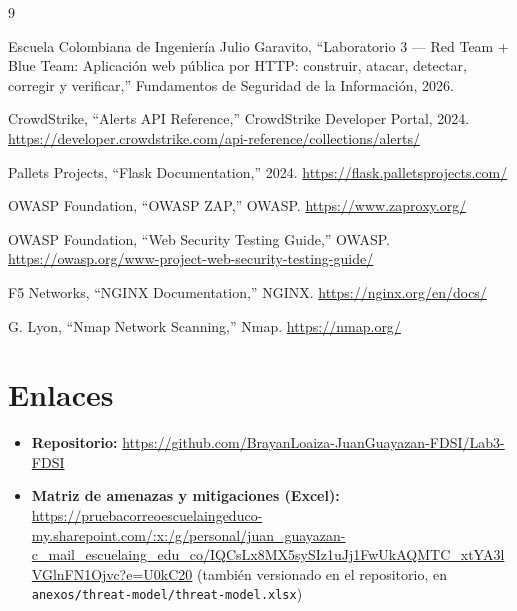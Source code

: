 \documentclass[journal]{IEEEtran}
\begin{document}
\begin{thebibliography}{9}

Escuela Colombiana de Ingeniería Julio Garavito,
``Laboratorio 3 --- Red Team + Blue Team: Aplicación web pública por HTTP:
construir, atacar, detectar, corregir y verificar,''
Fundamentos de Seguridad de la Información, 2026.

CrowdStrike,
``Alerts API Reference,''
CrowdStrike Developer Portal, 2024.
\url{https://developer.crowdstrike.com/api-reference/collections/alerts/}

Pallets Projects,
``Flask Documentation,'' 2024.
\url{https://flask.palletsprojects.com/}

OWASP Foundation,
``OWASP ZAP,''
OWASP.
\url{https://www.zaproxy.org/}

OWASP Foundation,
``Web Security Testing Guide,''
OWASP.
\url{https://owasp.org/www-project-web-security-testing-guide/}

F5 Networks,
``NGINX Documentation,''
NGINX.
\url{https://nginx.org/en/docs/}

G. Lyon,
``Nmap Network Scanning,''
Nmap.
\url{https://nmap.org/}

\end{thebibliography}

\appendices

\section{Enlaces}
\label{app:enlaces}

\begin{itemize}
    \item \textbf{Repositorio:}
    \url{https://github.com/BrayanLoaiza-JuanGuayazan-FDSI/Lab3-FDSI}
    \item \textbf{Matriz de amenazas y mitigaciones (Excel):}
    \url{https://pruebacorreoescuelaingeduco-my.sharepoint.com/:x:/g/personal/juan_guayazan-c_mail_escuelaing_edu_co/IQCsLx8MX5sySIz1uJj1FwUkAQMTC_xtYA3lVGlnFN1Ojvc?e=U0kC20}
    (también versionado en el repositorio, en
    \texttt{anexos/threat-model/threat-model.xlsx})
\end{itemize}
\end{document}

